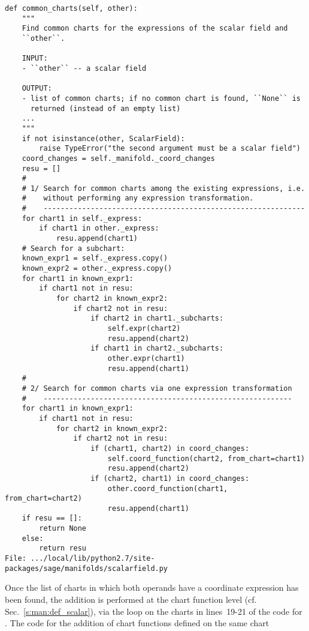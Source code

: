\begin{lstlisting}
def common_charts(self, other):
    """
    Find common charts for the expressions of the scalar field and
    ``other``.

    INPUT:
    - ``other`` -- a scalar field

    OUTPUT:
    - list of common charts; if no common chart is found, ``None`` is
      returned (instead of an empty list)
    ...
    """
    if not isinstance(other, ScalarField):
        raise TypeError("the second argument must be a scalar field")
    coord_changes = self._manifold._coord_changes
    resu = []
    #
    # 1/ Search for common charts among the existing expressions, i.e.
    #    without performing any expression transformation.
    #    -------------------------------------------------------------
    for chart1 in self._express:
        if chart1 in other._express:
            resu.append(chart1)
    # Search for a subchart:
    known_expr1 = self._express.copy()
    known_expr2 = other._express.copy()
    for chart1 in known_expr1:
        if chart1 not in resu:
            for chart2 in known_expr2:
                if chart2 not in resu:
                    if chart2 in chart1._subcharts:
                        self.expr(chart2)
                        resu.append(chart2)
                    if chart1 in chart2._subcharts:
                        other.expr(chart1)
                        resu.append(chart1)
    #
    # 2/ Search for common charts via one expression transformation
    #    ----------------------------------------------------------
    for chart1 in known_expr1:
        if chart1 not in resu:
            for chart2 in known_expr2:
                if chart2 not in resu:
                    if (chart1, chart2) in coord_changes:
                        self.coord_function(chart2, from_chart=chart1)
                        resu.append(chart2)
                    if (chart2, chart1) in coord_changes:
                        other.coord_function(chart1, from_chart=chart2)
                        resu.append(chart1)
    if resu == []:
        return None
    else:
        return resu
File: .../local/lib/python2.7/site-packages/sage/manifolds/scalarfield.py
\end{lstlisting}
Once the list of charts in which both operands have a coordinate expression
has been found,
the addition is performed at the chart function level (cf. Sec.~\ref{s:man:def_scalar}),
via the loop on the charts in lines~19-21 of the code for .
The code for the addition of chart functions defined on the same chart
